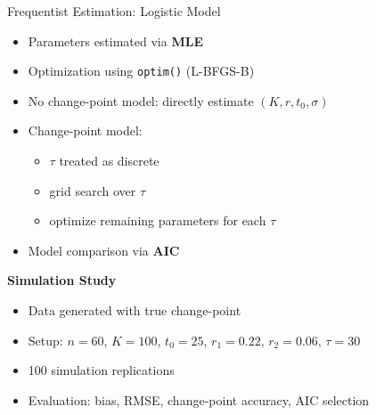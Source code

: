 \documentclass[
  ignorenonframetext,
  aspectratio=169,
]{beamer}
\providecommand{\tightlist}{%
  \setlength{\itemsep}{0pt}\setlength{\parskip}{0pt}}\usepackage{longtable,booktabs,array}
\begin{document}
\begin{frame}[fragile]{Frequentist Estimation: Logistic Model}
\label{frequentist-estimation-logistic-model}
\begin{itemize}
\tightlist
\item
  Parameters estimated via \textbf{MLE}
\item
  Optimization using \texttt{optim()} (L-BFGS-B)
\item
  No change-point model: directly estimate \((K, r, t_0, \sigma)\)
\item
  Change-point model:

  \begin{itemize}
  \tightlist
  \item
    \(\tau\) treated as discrete
  \item
    grid search over \(\tau\)
  \item
    optimize remaining parameters for each \(\tau\)
  \end{itemize}
\item
  Model comparison via \textbf{AIC}
\end{itemize}

\textbf{Simulation Study}

\begin{itemize}
\tightlist
\item
  Data generated with true change-point
\item
  Setup: \(n=60\), \(K=100\), \(t_0=25\), \(r_1=0.22\), \(r_2=0.06\),
  \(\tau=30\)
\item
  100 simulation replications\\
\item
  Evaluation: bias, RMSE, change-point accuracy, AIC selection
\end{itemize}
\end{frame}
\end{document}

